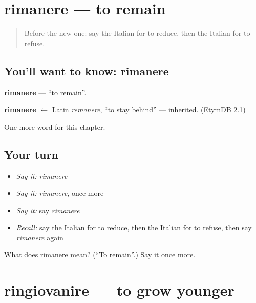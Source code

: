 \section[rimanere]{rimanere — to remain}

\label{lesson:IT-C147-rimanere}



\begin{quote}
Before the new one: say the Italian for to reduce, then the Italian for to refuse.
\end{quote}

\subsection*{You'll want to know: rimanere}
\textbf{rimanere} — \textquotedblleft{}to remain\textquotedblright{}.

\begin{cousinweb}
\textbf{rimanere} $\leftarrow$ Latin \emph{remanere}, \textquotedblleft{}to stay behind\textquotedblright{} — inherited. (EtymDB 2.1)
\end{cousinweb}

\begin{grammarlens}[title={What you've built}]
One more word for this chapter.
\end{grammarlens}

\subsection*{Your turn}
\begin{itemize}
\raggedright
  \item \emph{Say it:} \emph{rimanere}
  \item \emph{Say it:} \emph{rimanere}, once more
  \item \emph{Say it:} say \emph{rimanere}
  \item \emph{Recall:} say the Italian for to reduce, then the Italian for to refuse, then say \emph{rimanere} again
\end{itemize}

\begin{tcolorbox}[breakable,colback=teal!4,colframe=teal!35!black,title={Before you move on}]
What does rimanere mean? (\textquotedblleft{}To remain\textquotedblright{}.) Say it once more.
\end{tcolorbox}
\section[ringiovanire]{ringiovanire — to grow younger}

